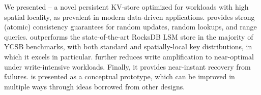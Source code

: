We presented \sys\/ -- a novel persistent KV-store optimized for workloads with high spatial locality, as prevalent in modern data-driven 
applications. \sys\/ provides strong (atomic) consistency guarantees for random updates, random lookups, and range queries. 
\sys\/ outperforms the state-of-the-art RocksDB LSM store  in the  majority of YCSB benchmarks, with both 
standard and spatially-local key distributions, in which it excels in particular. \sys\/ further reduces write amplification to near-optimal under write-intensive 
workloads. Finally, it provides near-instant recovery from failures.
\sys\/ is presented as a conceptual prototype, which can be improved in multiple ways through ideas borrowed from other designs. 

